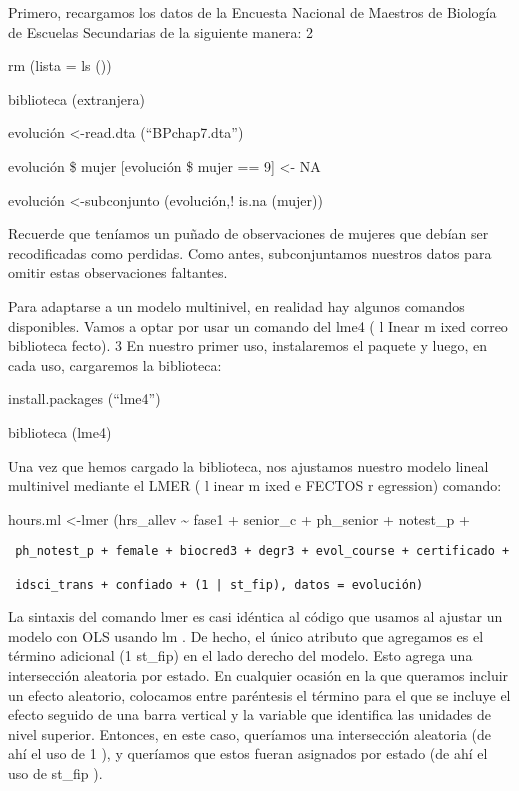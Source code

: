 \documentclass[
]{book}
\begin{document}
Primero, recargamos los datos de la Encuesta Nacional de Maestros de Biología de Escuelas Secundarias de la siguiente manera: 2

rm (lista = ls ())

biblioteca (extranjera)

evolución \textless-read.dta (``BPchap7.dta'')

evolución \$ mujer {[}evolución \$ mujer == 9{]} \textless- NA

evolución \textless-subconjunto (evolución,! is.na (mujer))

Recuerde que teníamos un puñado de observaciones de mujeres que debían ser recodificadas como perdidas. Como antes, subconjuntamos nuestros datos para omitir estas observaciones faltantes.

Para adaptarse a un modelo multinivel, en realidad hay algunos comandos disponibles. Vamos a optar por usar un comando del lme4 ( l Inear m ixed correo biblioteca fecto). 3 En nuestro primer uso, instalaremos el paquete y luego, en cada uso, cargaremos la biblioteca:

install.packages (``lme4'')

biblioteca (lme4)

Una vez que hemos cargado la biblioteca, nos ajustamos nuestro modelo lineal multinivel mediante el LMER ( l inear m ixed e FECTOS r egression) comando:

hours.ml \textless-lmer (hrs\_allev \textasciitilde{} fase1 + senior\_c + ph\_senior + notest\_p +

\begin{verbatim}
 ph_notest_p + female + biocred3 + degr3 + evol_course + certificado +

 idsci_trans + confiado + (1 | st_fip), datos = evolución)
\end{verbatim}

La sintaxis del comando lmer es casi idéntica al código que usamos al ajustar un modelo con OLS usando lm . De hecho, el único atributo que agregamos es el término adicional (1 \textbar{} st\_fip) en el lado derecho del modelo. Esto agrega una intersección aleatoria por estado. En cualquier ocasión en la que queramos incluir un efecto aleatorio, colocamos entre paréntesis el término para el que se incluye el efecto seguido de una barra vertical y la variable que identifica las unidades de nivel superior. Entonces, en este caso, queríamos una intersección aleatoria (de ahí el uso de 1 ), y queríamos que estos fueran asignados por estado (de ahí el uso de st\_fip ).
\end{document}
